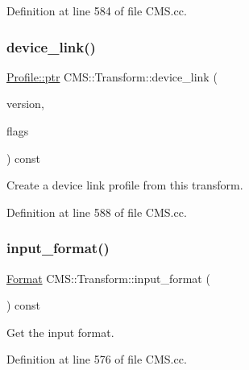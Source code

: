 Definition at line 584 of file C\+M\+S.\+cc.

\mbox{\label{class_c_m_s_1_1_transform_ac8998c2530857d890e77ada564fec20a}} 
\subsubsection{\texorpdfstring{device\+\_\+link()}{device\_link()}}
{\footnotesize\ttfamily \hyperlink{class_c_m_s_1_1_profile_a7d5a80e1317d17dbfdf5ae69820ab08b}{Profile\+::ptr} C\+M\+S\+::\+Transform\+::device\+\_\+link (\begin{DoxyParamCaption}\item[{double}]{version,  }\item[{cms\+U\+Int32\+Number}]{flags }\end{DoxyParamCaption}) const}



Create a device link profile from this transform. 



Definition at line 588 of file C\+M\+S.\+cc.

\mbox{\label{class_c_m_s_1_1_transform_a2ae2120950c35eccd3dd9006d39b0049}} 
\subsubsection{\texorpdfstring{input\+\_\+format()}{input\_format()}}
{\footnotesize\ttfamily \hyperlink{class_c_m_s_1_1_format}{Format} C\+M\+S\+::\+Transform\+::input\+\_\+format (\begin{DoxyParamCaption}\item[{void}]{ }\end{DoxyParamCaption}) const}



Get the input format. 



Definition at line 576 of file C\+M\+S.\+cc.

\mbox{\label{class_c_m_s_1_1_transform_af907adbba92096714d54d99e9a99c53d}} 

